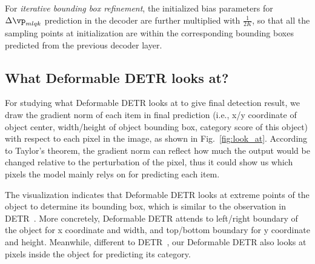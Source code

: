 For \emph{iterative bounding box refinement}, the initialized bias parameters for $\Delta\vp_{mlqk}$ prediction in the decoder are further multiplied with $\frac{1}{2K}$, so that all the sampling points at initialization are within the corresponding bounding boxes predicted from the previous decoder layer.


\subsection{What Deformable DETR looks at?}
\label{sec:look_at}

 For studying what Deformable DETR looks at to give final detection result, we draw the gradient norm of each item in final prediction (i.e., x/y coordinate of object center, width/height of object bounding box, category score of this object) with respect to each pixel in the image, as shown in Fig.~\ref{fig:look_at}. According to Taylor's theorem, the gradient norm can reflect how much the output would be changed relative to the perturbation of the pixel, thus it could show us which pixels the model mainly relys on for predicting each item. 

 The visualization indicates that Deformable DETR looks at extreme points of the object to determine its bounding box, which is similar to the observation in DETR~\citep{carion2020end}. More concretely, Deformable DETR attends to left/right boundary of the object for x coordinate and width, and top/bottom boundary for y coordinate and height. Meanwhile, different to DETR~\citep{carion2020end}, our Deformable DETR also looks at pixels inside the object for predicting its category.


